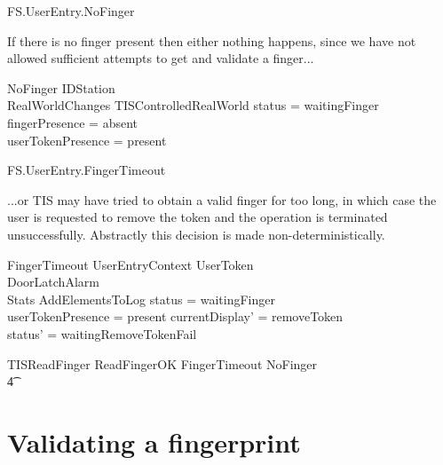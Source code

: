 \begin{traceunit}{FS.UserEntry.NoFinger}
\end{traceunit}


If there is no finger present then either nothing happens, since we
have not allowed sufficient attempts to get and validate a finger...

\begin{schema}{NoFinger}
        \Xi IDStation
\\      RealWorldChanges
\also
        \Xi TISControlledRealWorld
\where
        status = waitingFinger
\\      fingerPresence = absent
\\      userTokenPresence = present
\end{schema}


\begin{traceunit}{FS.UserEntry.FingerTimeout}
\end{traceunit}

...or TIS may have tried to obtain a valid finger for too
long, in which case the user is requested to remove the token and 
the operation is terminated unsuccessfully. Abstractly this  decision
is made non-deterministically.

\begin{schema}{FingerTimeout}
        UserEntryContext
\also
        \Xi UserToken
\\      \Xi DoorLatchAlarm
\\      \Xi Stats       
\also
        AddElementsToLog
\where
        status = waitingFinger
\\      userTokenPresence = present
\also
        currentDisplay' = removeToken
\\      status' = waitingRemoveTokenFail
\end{schema}

\begin{zed}
        TISReadFinger  ReadFingerOK \lor
        FingerTimeout \lor NoFinger 
\\ \t4  \lor [~ UserTokenTorn | status = waitingFinger ~]
\end{zed}

\section{Validating a fingerprint}

